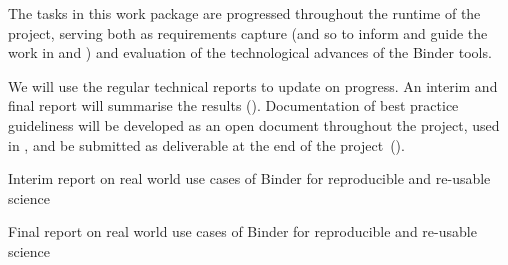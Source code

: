 \begin{workpackage}[
  id=applications,
  wphases=0-36!1.11,
  swsites,
  title=Applications and use cases,
  short=Applications,
  lead=MP,
  MPRM=15,
  SRLRM=3,
  UIORM=8,
  IFRRM=14
]
\begin{wpdescription}
  \medskip

  The tasks in this work package are progressed throughout the runtime of the
  project, serving both as requirements capture (and so to inform and guide the
  work in  and ) and evaluation of the
  technological advances of the Binder tools.

  We will use the regular technical reports to update on progress. An
  interim  and final
  report will summarise the results ().
  Documentation of best practice guideliness will be developed as an open
  document throughout the project, used in , and be submitted
  as deliverable at the end of the project~().
\end{wpdescription}

\begin{tasklist}


%



\end{tasklist}


\begin{wpdelivs}
  \begin{wpdeliv}[
    id=report-use-cases-interim,
    lead=MP,
    due=18,
    miles=prototype,
    dissem=PU,
    nature=DEC,
    ]
    {
      Interim report on real world use cases of Binder for reproducible and re-usable science
    }
  \end{wpdeliv}

  \begin{wpdeliv}[
    id=report-use-cases,
    lead=MP,
    due=34,
    miles=final,
    dissem=PU,
    nature=DEC,
    ]
    {
      Final report on real world use cases of Binder for reproducible and re-usable science
    }
  \end{wpdeliv}

  

\end{wpdelivs}
\end{workpackage}

